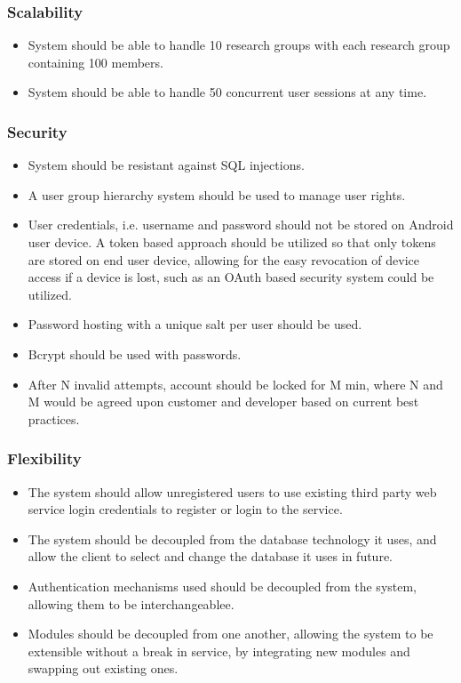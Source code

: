 \documentclass[a4paper,10pt]{article}
\begin{document}
\subsubsection{Scalability}
\begin{itemize}
\item System should be able to handle 10 research groups with each research group containing 100 members.
\item System should be able to handle 50 concurrent user sessions at any time.
\end{itemize}

\subsubsection{Security}
\begin{itemize}
\item System should be resistant against SQL injections.
\item A user group hierarchy system should be used to manage user rights.
\item User credentials, i.e. username and password should not be stored on Android user device. A token based approach should be utilized so that only tokens are stored on end user device, allowing for the easy revocation of device access if a device is lost, such as an OAuth based security system could be utilized.
\item Password hosting with a unique salt per user should be used.
\item Bcrypt should be used with passwords.
\item After N invalid attempts, account should be locked for M min, where N and M would be agreed upon customer and developer based on current best practices.
\end{itemize}

\subsubsection{Flexibility}
\begin{itemize}
\item The system should allow unregistered users to use existing third party web service login credentials to register or login to the service.
\item The system should be decoupled from the database technology it uses, and allow the client to select and change the database it uses in future.
\item Authentication mechanisms used should be decoupled from the system, allowing them to be interchangeablee.
\item Modules should be decoupled from one another, allowing the system to be extensible without a break in service, by integrating new modules and swapping out existing ones. 
\end{itemize}
\end{document}
